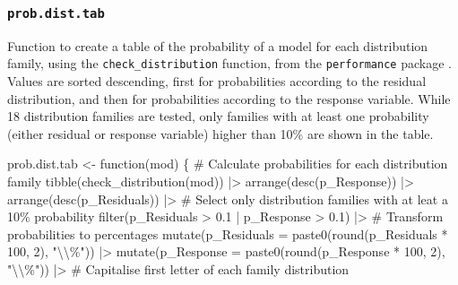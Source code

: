 \documentclass[
  bookmarksnumbered]{article}
\newenvironment{Shaded}{\begin{snugshade}}{\end{snugshade}}
\newcommand{\AttributeTok}[1]{\textcolor[rgb]{0.80,0.80,0.80}{#1}}
\newcommand{\CommentTok}[1]{\textcolor[rgb]{0.50,0.62,0.50}{#1}}
\newcommand{\ControlFlowTok}[1]{\textcolor[rgb]{0.94,0.87,0.69}{#1}}
\newcommand{\DecValTok}[1]{\textcolor[rgb]{0.86,0.86,0.80}{#1}}
\newcommand{\FloatTok}[1]{\textcolor[rgb]{0.75,0.75,0.82}{#1}}
\newcommand{\FunctionTok}[1]{\textcolor[rgb]{0.94,0.94,0.56}{#1}}
\newcommand{\NormalTok}[1]{\textcolor[rgb]{0.80,0.80,0.80}{#1}}
\newcommand{\OtherTok}[1]{\textcolor[rgb]{0.94,0.94,0.56}{#1}}
\newcommand{\SpecialCharTok}[1]{\textcolor[rgb]{0.86,0.64,0.64}{#1}}
\newcommand{\StringTok}[1]{\textcolor[rgb]{0.80,0.58,0.58}{#1}}
\begin{document}
\subsubsection{\texorpdfstring{\texttt{prob.dist.tab}}{prob.dist.tab}}\label{prob.dist.tab}

Function to create a table of the probability of a model for each distribution family, using the \texttt{check\_distribution} function, from the \texttt{performance} package \autocite{ludecke2021}. Values are sorted descending, first for probabilities according to the residual distribution, and then for probabilities according to the response variable. While 18 distribution families are tested, only families with at least one probability (either residual or response variable) higher than 10\% are shown in the table.

\begin{Shaded}
\begin{Highlighting}[]
\NormalTok{prob.dist.tab }\OtherTok{\textless{}{-}} \ControlFlowTok{function}\NormalTok{(mod) \{}
  \CommentTok{\# Calculate probabilities for each distribution family}
  \FunctionTok{tibble}\NormalTok{(}\FunctionTok{check\_distribution}\NormalTok{(mod)) }\SpecialCharTok{|\textgreater{}}
    \FunctionTok{arrange}\NormalTok{(}\FunctionTok{desc}\NormalTok{(p\_Response)) }\SpecialCharTok{|\textgreater{}}
    \FunctionTok{arrange}\NormalTok{(}\FunctionTok{desc}\NormalTok{(p\_Residuals)) }\SpecialCharTok{|\textgreater{}}
    \CommentTok{\# Select only distribution families with at leat a 10\% probability}
    \FunctionTok{filter}\NormalTok{(p\_Residuals }\SpecialCharTok{\textgreater{}} \FloatTok{0.1} \SpecialCharTok{|}\NormalTok{ p\_Response }\SpecialCharTok{\textgreater{}} \FloatTok{0.1}\NormalTok{) }\SpecialCharTok{|\textgreater{}}
    \CommentTok{\# Transform probabilities to percentages}
    \FunctionTok{mutate}\NormalTok{(}\AttributeTok{p\_Residuals =} \FunctionTok{paste0}\NormalTok{(}\FunctionTok{round}\NormalTok{(p\_Residuals }\SpecialCharTok{*} \DecValTok{100}\NormalTok{, }\DecValTok{2}\NormalTok{), }\StringTok{"}\SpecialCharTok{\textbackslash{}\textbackslash{}}\StringTok{\%"}\NormalTok{)) }\SpecialCharTok{|\textgreater{}}
    \FunctionTok{mutate}\NormalTok{(}\AttributeTok{p\_Response =} \FunctionTok{paste0}\NormalTok{(}\FunctionTok{round}\NormalTok{(p\_Response }\SpecialCharTok{*} \DecValTok{100}\NormalTok{, }\DecValTok{2}\NormalTok{), }\StringTok{"}\SpecialCharTok{\textbackslash{}\textbackslash{}}\StringTok{\%"}\NormalTok{)) }\SpecialCharTok{|\textgreater{}}
    \CommentTok{\# Capitalise first letter of each family distribution}

\end{Highlighting}
\end{Shaded}
\end{document}
